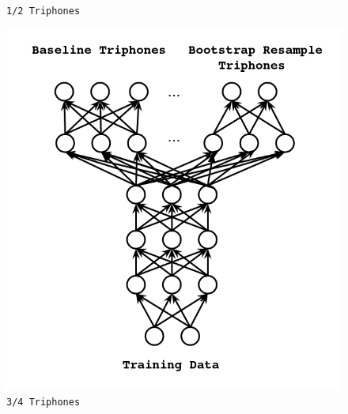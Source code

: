 \documentclass[10pt,a4paper]{article}
\begin{document}
\begin{enumerate}
\begin{figure}[!htb]
  \caption{\texttt{1/2 Triphones}}
\endminipage\hfill
{}%
  \includegraphics[width=\linewidth]{figs/mtl-arch-resampled.png}
  \caption{\texttt{3/4 Triphones}}
\endminipage
\end{figure}





\end{enumerate}
\end{document}
